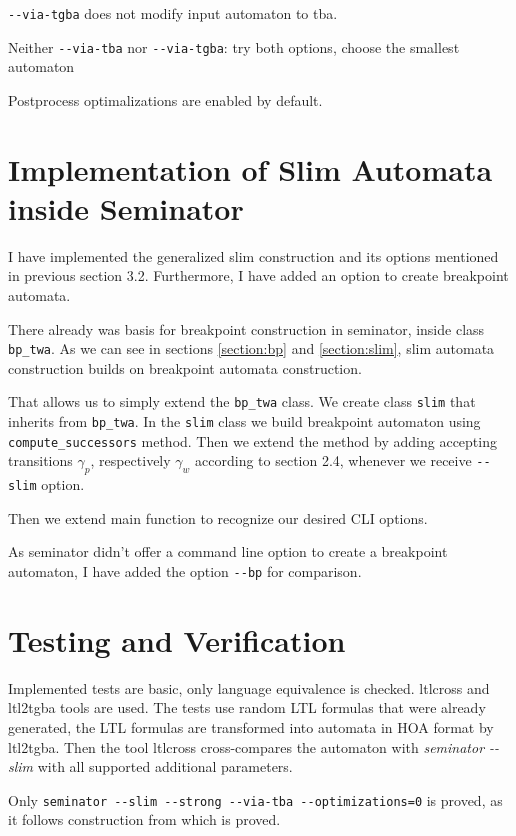 \documentclass[
	digital
nolof, nolot
]{fithesis3}
\begin{document}
		\texttt{-{}-via-tgba} does not modify input automaton to tba.
		
		Neither \texttt{-{}-via-tba} nor \texttt{-{}-via-tgba}: try both options, choose the smallest automaton
		
		Postprocess optimalizations are enabled by default.
		
		
	\section{Implementation of Slim Automata inside Seminator}
	I have implemented the generalized slim construction and its options mentioned in previous section 3.2. Furthermore, I have added an option to create breakpoint automata.
	
	There already was basis for breakpoint construction in seminator, inside class \texttt{bp\_twa}.
	As we can see in sections \ref{section:bp} and \ref{section:slim}, slim automata construction builds on breakpoint automata construction.
	
	That allows us to simply extend the \texttt{bp\_twa} class.
	We create class \texttt{slim} that inherits from \texttt{bp\_twa}.
	In the \texttt{slim} class we build breakpoint automaton using \texttt{compute\_successors} method.
	Then we extend the method by adding accepting transitions $\gamma_p$, respectively $\gamma_w$ according to section 2.4, whenever we receive \texttt{-{}-slim} option.
	
	Then we extend main function to recognize our desired CLI options.
	
	As seminator didn't offer a command line option to create a breakpoint automaton, I have added the option \texttt{-{}-bp} for comparison.
	
	
	
	\section{Testing and Verification}
	Implemented tests are basic, only language equivalence is checked.
	ltlcross and ltl2tgba tools are used. The tests use random LTL formulas that were already generated, the LTL formulas are transformed into automata in HOA format by ltl2tgba.
	Then the tool ltlcross cross-compares the automaton with \emph{seminator -{}-slim} with all supported additional parameters.
	
	Only \texttt{seminator -{}-slim -{}-strong -{}-via-tba -{}-optimizations=0} is proved, as it follows construction from \cite{hlavni} which is proved.
	
\end{document}
